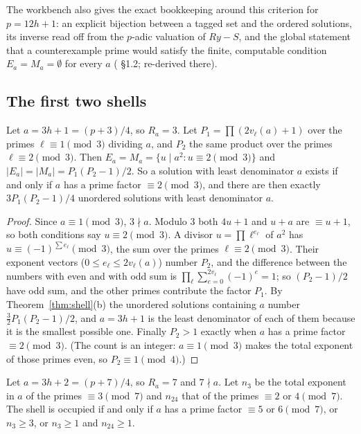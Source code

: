 The workbench also gives the exact bookkeeping around this criterion for $p=12h+1$: an explicit bijection between a tagged set and the ordered solutions, its inverse read off from the $p$-adic valuation of $Ry-S$, and the global statement that a counterexample prime would satisfy the finite, computable condition $E_a=M_a=\emptyset$ for every $a$ ( §1.2; re-derived there).

\subsection{The first two shells}

\begin{proposition}\label{prop:r3}
Let $a=3h+1=(p+3)/4$, so $R_a=3$. Let $P_1=\prod(2v_\ell(a)+1)$ over the primes $\ell\equiv1\pmod3$ dividing $a$, and $P_2$ the same product over the primes $\ell\equiv2\pmod3$. Then $E_a=M_a=\{u\mid a^2: u\equiv2\pmod3\}$ and $|E_a|=|M_a|=P_1(P_2-1)/2$. So a solution with least denominator $a$ exists if and only if $a$ has a prime factor $\equiv2\pmod3$, and there are then exactly $3P_1(P_2-1)/4$ unordered solutions with least denominator $a$.
\end{proposition}

\begin{proof}
Since $a\equiv1\pmod3$, $3\nmid a$. Modulo $3$ both $4u+1$ and $u+a$ are $\equiv u+1$, so both conditions say $u\equiv2\pmod3$. A divisor $u=\prod\ell^{e_\ell}$ of $a^2$ has $u\equiv(-1)^{\sum e_\ell}\pmod3$, the sum over the primes $\ell\equiv2\pmod3$. Their exponent vectors ($0\le e_\ell\le2v_\ell(a)$) number $P_2$, and the difference between the numbers with even and with odd sum is $\prod_\ell\sum_{e=0}^{2v_\ell}(-1)^e=1$; so $(P_2-1)/2$ have odd sum, and the other primes contribute the factor $P_1$. By Theorem~\ref{thm:shell}(b) the unordered solutions containing $a$ number $\tfrac32P_1(P_2-1)/2$, and $a=3h+1$ is the least denominator of each of them because it is the smallest possible one. Finally $P_2>1$ exactly when $a$ has a prime factor $\equiv2\pmod3$. (The count is an integer: $a\equiv1\pmod 3$ makes the total exponent of those primes even, so $P_2\equiv1\pmod4$.)
\end{proof}

\begin{proposition}\label{prop:r7}
Let $a=3h+2=(p+7)/4$, so $R_a=7$ and $7\nmid a$. Let $n_3$ be the total exponent in $a$ of the primes $\equiv3\pmod7$ and $n_{24}$ that of the primes $\equiv2$ or $4\pmod 7$. The shell is occupied if and only if $a$ has a prime factor $\equiv5$ or $6\pmod7$, or $n_3\ge3$, or $n_3\ge1$ and $n_{24}\ge1$.
\end{proposition}

